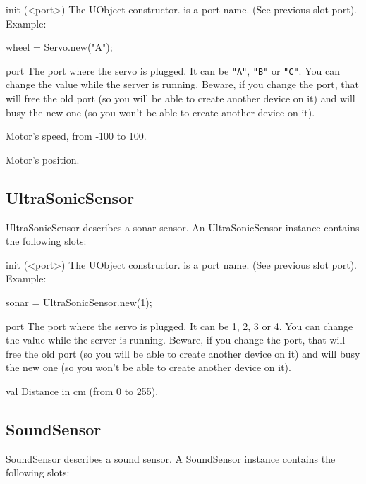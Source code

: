 \begin{urbiscriptapi}
\item[init](<port>) The UObject constructor.  is a port name. (See
  previous slot port). Example:
\begin{urbiunchecked}
wheel = Servo.new("A");
\end{urbiunchecked}


\item[port] The port where the servo is plugged. It can be \lstinline{"A"},
  \lstinline{"B"} or \lstinline{"C"}. You can change the value while the
  server is running. Beware, if you change the port, that will free the old
  port (so you will be able to create another device on it) and will busy
  the new one (so you won't be able to create another device on it).


\item[speed] Motor's speed, from -100 to 100.


\item[val] Motor's position.
\end{urbiscriptapi}


\subsection{UltraSonicSensor}
UltraSonicSensor describes a sonar sensor. An UltraSonicSensor instance
contains the following slots:

\begin{urbiscriptapi}
\item[init](<port>) The UObject constructor.  is a port name. (See
  previous slot port). Example:
\begin{urbiunchecked}
sonar = UltraSonicSensor.new(1);
\end{urbiunchecked}


\item[port] The port where the servo is plugged. It can be 1, 2, 3 or 4. You
  can change the value while the server is running. Beware, if you change
  the port, that will free the old port (so you will be able to create
  another device on it) and will busy the new one (so you won't be able to
  create another device on it).


\item[val] Distance in cm (from 0 to 255).
\end{urbiscriptapi}

\subsection{SoundSensor}
SoundSensor describes a sound sensor. A SoundSensor instance contains the
following slots:

